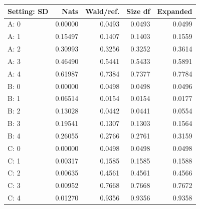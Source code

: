 \begin{tabular}{@{}lrrrr@{}}
\toprule
Setting: SD & Nats & Wald/ref. & Size df & Expanded\\
\midrule
A: 0 & 0.00000 & 0.0493 & 0.0493 & 0.0499\\
A: 1 & 0.15497 & 0.1407 & 0.1403 & 0.1559\\
A: 2 & 0.30993 & 0.3256 & 0.3252 & 0.3614\\
A: 3 & 0.46490 & 0.5441 & 0.5433 & 0.5891\\
A: 4 & 0.61987 & 0.7384 & 0.7377 & 0.7784\\
B: 0 & 0.00000 & 0.0498 & 0.0498 & 0.0496\\
B: 1 & 0.06514 & 0.0154 & 0.0154 & 0.0177\\
B: 2 & 0.13028 & 0.0442 & 0.0441 & 0.0554\\
B: 3 & 0.19541 & 0.1307 & 0.1303 & 0.1564\\
B: 4 & 0.26055 & 0.2766 & 0.2761 & 0.3159\\
C: 0 & 0.00000 & 0.0498 & 0.0498 & 0.0498\\
C: 1 & 0.00317 & 0.1585 & 0.1585 & 0.1588\\
C: 2 & 0.00635 & 0.4561 & 0.4561 & 0.4566\\
C: 3 & 0.00952 & 0.7668 & 0.7668 & 0.7672\\
C: 4 & 0.01270 & 0.9356 & 0.9356 & 0.9358\\
\bottomrule
\end{tabular}
